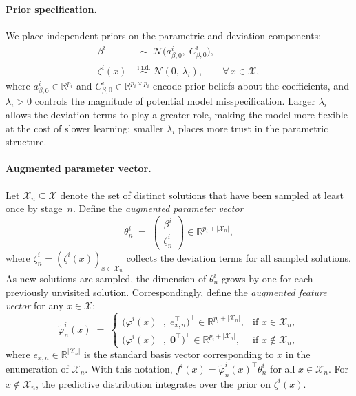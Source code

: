 \documentclass[12pt]{article}
\theoremstyle{plain}
\theoremstyle{definition}
\theoremstyle{remark}
\begin{document}
\paragraph{Prior specification.}
We place independent priors on the parametric and deviation components:
\begin{align}
  \beta^i &\;\sim\; \mathcal{N}\bigl(a^i_{\beta,0},\; C^i_{\beta,0}\bigr), \label{eq:prior_beta} \\
  \zeta^i(x) &\;\overset{\text{i.i.d.}}{\sim}\; \mathcal{N}(0,\, \lambda_i), \qquad \forall\, x \in \mathcal{X}, \label{eq:prior_zeta}
\end{align}
where $a^i_{\beta,0} \in \mathbb{R}^{p_i}$ and $C^i_{\beta,0} \in \mathbb{R}^{p_i \times p_i}$ encode prior beliefs about the coefficients, and $\lambda_i > 0$ controls the magnitude of potential model misspecification. Larger $\lambda_i$ allows the deviation terms to play a greater role, making the model more flexible at the cost of slower learning; smaller $\lambda_i$ places more trust in the parametric structure.

\paragraph{Augmented parameter vector.}
Let $\mathcal{X}_n \subseteq \mathcal{X}$ denote the set of distinct solutions that have been sampled at least once by stage~$n$. Define the \emph{augmented parameter vector}
\begin{equation}\label{eq:augmented_theta}
  \theta^i_n \;=\; \begin{pmatrix} \beta^i \\ \zeta^i_n \end{pmatrix} \in \mathbb{R}^{p_i + |\mathcal{X}_n|},
\end{equation}
where $\zeta^i_n = (\zeta^i(x))_{x \in \mathcal{X}_n}$ collects the deviation terms for all sampled solutions. As new solutions are sampled, the dimension of $\theta^i_n$ grows by one for each previously unvisited solution. Correspondingly, define the \emph{augmented feature vector} for any $x \in \mathcal{X}$:
\begin{equation}\label{eq:augmented_feature}
  \tilde{\varphi}^i_n(x) \;=\;
  \begin{cases}
    \bigl(\varphi^i(x)^\top,\; e_{x,n}^\top \bigr)^\top \in \mathbb{R}^{p_i + |\mathcal{X}_n|}, & \text{if } x \in \mathcal{X}_n, \\[4pt]
    \bigl(\varphi^i(x)^\top,\; \mathbf{0}^\top \bigr)^\top \in \mathbb{R}^{p_i + |\mathcal{X}_n|}, & \text{if } x \notin \mathcal{X}_n,
  \end{cases}
\end{equation}
where $e_{x,n} \in \mathbb{R}^{|\mathcal{X}_n|}$ is the standard basis vector corresponding to $x$ in the enumeration of $\mathcal{X}_n$. With this notation, $f^i(x) = \tilde{\varphi}^i_n(x)^\top \theta^i_n$ for all $x \in \mathcal{X}_n$. For $x \notin \mathcal{X}_n$, the predictive distribution integrates over the prior on $\zeta^i(x)$.
\end{document}
